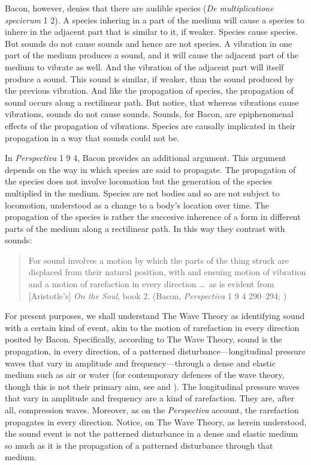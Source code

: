 Bacon, however, denies that there are audible species (\emph{De multiplicatione specierum} 1 2). A species inhering in a part of the medium will cause a species to inhere in the adjacent part that is similar to it, if weaker. Species cause species. But sounds do not cause sounds and hence are not species. A vibration in one part of the medium produces a sound, and it will cause the adjacent part of the medium to vibrate as well. And the vibration of the adjacent part will itself produce a sound. This sound is similar, if weaker, than the sound produced by the previous vibration. And like the propagation of species, the propagation of sound occurs along a rectilinear path. But notice, that whereas vibrations cause vibrations, sounds do not cause sounds. Sounds, for Bacon, are epiphenomenal effects of the propagation of vibrations. Species are causally implicated in their propagation in a way that sounds could not be.

In \emph{Perspectiva} 1 9 4, Bacon provides an additional argument. This argument depends on the way in which species are said to propagate. The propagation of the species does not involve locomotion but the generation of the species multiplied in the medium. Species are not bodies and so are not subject to locomotion, understood as a change to a body's location over time. The propagation of the species is rather the succesive inherence of a form in different parts of the medium along a rectilinear path. In this way they contrast with sounds:
\begin{quote}
	For sound involves a motion by which the parts of the thing struck are displaced from their natural position, with and ensuing motion of vibration and a motion of rarefaction in every direction \ldots\ as is evident from [Aristotle's] \emph{On the Soul}, book 2. (Bacon, \emph{Perspectiva} 1 9 4 290--294; \citealt[143]{Lindberg:1996bk})
\end{quote}

For present purposes, we shall understand The Wave Theory as identifying sound with a certain kind of event, akin to the motion of rarefaction in every direction posited by Bacon. Specifically, according to The Wave Theory, sound is the propagation, in every direction, of a patterned disturbance---longitudinal pressure waves that vary in amplitude and frequency---through a dense and elastic medium such as air or water (for contemporary defences of the wave theory, though this is not their primary aim, see \citealt{OShaughnessy:2009aa} and \citealt{Sorensen:2009aa}). The longitudinal pressure waves that vary in amplitude and frequency are a kind of rarefaction. They are, after all, compression waves. Moreover, as on the \emph{Perspectiva} account, the rarefaction propagates in every direction. Notice, on The Wave Theory, as herein understood, the sound event is not the patterned disturbance in a dense and elastic medium so much as it is the propagation of a patterned disturbance through that medium. 

